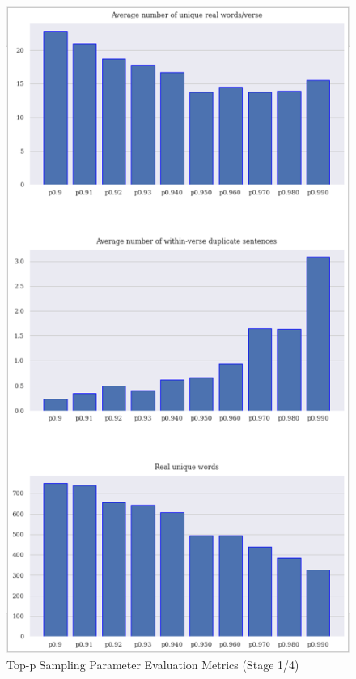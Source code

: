 \begin{figure}[h]
    \centering
    \includegraphics[scale=0.85,keepaspectratio=true]{figures/top-p_param_eval_s1.png}
    \caption{Top-p Sampling Parameter Evaluation Metrics (Stage 1/4)}
    \label{fig:top-p-param-eval-s1}
\end{figure}

